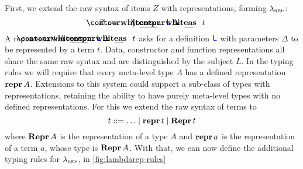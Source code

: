 First, we extend the raw syntax of items $Z$ with representations, forming
$\lambda_{\textsc{rep}}$:
\[
  Z ::= \ldots \mid \Srepr{R}{L}{\Delta}{t}
\]
A representation $\Srepr{R}{L}{\Delta}{t}$ asks for a definition ${\color{blue}{\mathsf{L}}}$ with
parameters $\Delta$ to be represented by a term $t$. Data, constructor and
function representations all share the same raw syntax and are distinguished by
the subject $L$. In the typing rules we will require that every meta-level type
$A$ has a defined representation $\textbf{repr}\, {A}$. Extensions to this system could
support a sub-class of types with representations, retaining the ability to
have purely meta-level types with no defined representations. For this we
extend the raw syntax of terms to
\[
  t ::= \ldots \mid \textbf{repr}\, {t} \mid \textbf{Repr}\, {t}
\]
where $\textbf{Repr}\, {A}$ is the representation of a type $A$ and $\textbf{repr}\, {a}$ is the
representation of a term $a$, whose type is $\textbf{Repr}\, {A}$. With that, we can now
define the additional typing rules for $\lambda_{\textsc{rep}}$, in
\cref{fig:lambdarep-rules}

